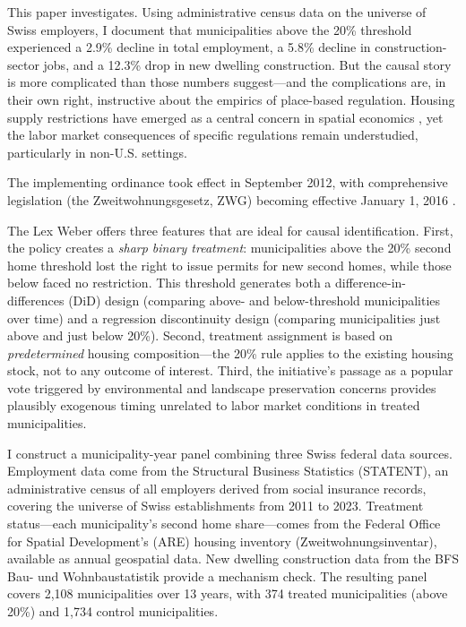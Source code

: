 \documentclass[12pt]{article}
\begin{document}
This paper investigates. Using administrative census data on the universe of Swiss employers, I document that municipalities above the 20\% threshold experienced a 2.9\% decline in total employment, a 5.8\% decline in construction-sector jobs, and a 12.3\% drop in new dwelling construction. But the causal story is more complicated than those numbers suggest---and the complications are, in their own right, instructive about the empirics of place-based regulation. Housing supply restrictions have emerged as a central concern in spatial economics \citep{saiz2010, hsiehmoretti2019, suarez2023}, yet the labor market consequences of specific regulations remain understudied, particularly in non-U.S. settings.

The implementing ordinance took effect in September 2012, with comprehensive legislation (the Zweitwohnungsgesetz, ZWG) becoming effective January 1, 2016 \citep{fedlex_zwg}.

The Lex Weber offers three features that are ideal for causal identification. First, the policy creates a \textit{sharp binary treatment}: municipalities above the 20\% second home threshold lost the right to issue permits for new second homes, while those below faced no restriction. This threshold generates both a difference-in-differences (DiD) design (comparing above- and below-threshold municipalities over time) and a regression discontinuity design (comparing municipalities just above and just below 20\%). Second, treatment assignment is based on \textit{predetermined} housing composition---the 20\% rule applies to the existing housing stock, not to any outcome of interest. Third, the initiative's passage as a popular vote triggered by environmental and landscape preservation concerns provides plausibly exogenous timing unrelated to labor market conditions in treated municipalities.

I construct a municipality-year panel combining three Swiss federal data sources. Employment data come from the Structural Business Statistics (STATENT), an administrative census of all employers derived from social insurance records, covering the universe of Swiss establishments from 2011 to 2023. Treatment status---each municipality's second home share---comes from the Federal Office for Spatial Development's (ARE) housing inventory (Zweitwohnungsinventar), available as annual geospatial data. New dwelling construction data from the BFS Bau- und Wohnbaustatistik provide a mechanism check. The resulting panel covers 2,108 municipalities over 13 years, with 374 treated municipalities (above 20\%) and 1,734 control municipalities.
\end{document}
